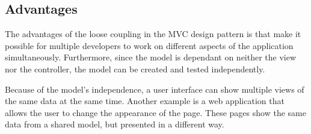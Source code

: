\subsection{Advantages}

The advantages of the loose coupling in the MVC design pattern is that make it possible for 
multiple developers to work on different aspects of the application simultaneously. 
Furthermore, since the model is dependant on neither the view nor the controller, the model 
can be created and tested independently.

Because of the model's independence, a user interface can show multiple views of the same 
data at the same time. Another example is a web application that 
allows the user to change the appearance of the page. These pages show the same data from a 
shared model, but presented in a different way\cite{modelviewcontroller}. 